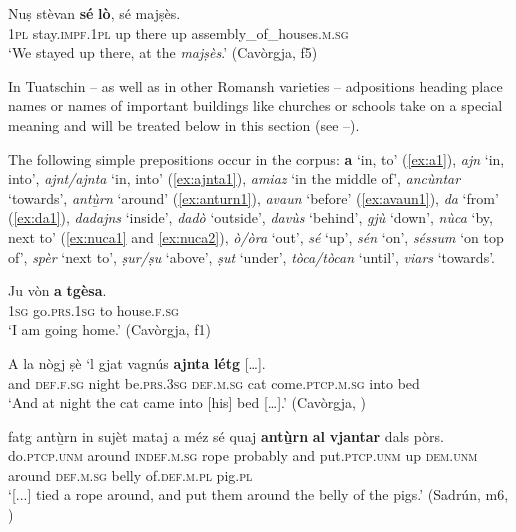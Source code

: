 \ea
\label{selo1}
\gll Nuṣ stèvan \textbf{sé} \textbf{lò}, sé majṣès.\\
\textsc{1pl} stay.\textsc{impf.1pl} up there up assembly\_of\_houses.\textsc{m.sg}\\
\glt `We stayed up there, at the \textit{majṣès}.' (Cavòrgja, f5)
\z

In Tuatschin -- as well as in other Romansh varieties -- adpositions heading place names or names of important buildings like churches or schools take on a special meaning and will be treated below in this section (see --).

The following simple prepositions occur in the corpus: \textbf{a} `in, to' (\ref{ex:a1}), \textit{ajn} `in, into', \textit{ajnt/ajnta} `in, into' (\ref{ex:ajnta1}), \textit{amiaz} `in the middle of', \textit{ancùntar} `towards', \textit{antù̱rn} `around' (\ref{ex:anturn1}), \textit{avaun} `before' (\ref{ex:avaun1}), \textit{da} `from' (\ref{ex:da1}), \textit{dadajns} `inside', \textit{dadò} `outside', \textit{\textit{davùs}} `behind', \textit{gjù} `down', \textit{nùca} `by, next to' (\ref{ex:nuca1} and \ref{ex:nuca2}), \textit{ò/òra} `out', \textit{sé} `up', \textit{sén} `on', \textit{séssum} `on top of', \textit{spèr} `next to', \textit{ṣur/ṣu} `above', \textit{ṣut} `under', \textit{tòca/tòcan} `until', \textit{viars} `towards'.

\ea
\label{ex:a1}
\gll Ju vòn \textbf{a} \textbf{tgèsa}.\\
\textsc{1sg} go.\textsc{prs.1sg} to house.\textsc{f.sg}\\
\glt `I am going home.' (Cavòrgja, f1)
\z

\ea
\label{ex:ajnta1}
\gll A la nògj ṣè `l gjat vagnús \textbf{ajnta} \textbf{létg} […].\\
and \textsc{def.f.sg} night be.\textsc{prs.3sg} \textsc{def.m.sg} cat come.\textsc{ptcp.m.sg} into bed\\
\glt `And at night the cat came into [his] bed […].' (Cavòrgja, \citealt[121]{Büchli1966})
\z

\ea
\label{ex:anturn1}
\gll    [...] fatg antù̱rn in sujèt mataj a méz sé quaj \textbf{antù̱rn} \textbf{al} \textbf{vjantar} dals pòrs.\\
{} do.\textsc{ptcp.unm} around \textsc{indef.m.sg} rope probably and put.\textsc{ptcp.unm} up  \textsc{dem.unm} around \textsc{def.m.sg} belly of.\textsc{def.m.pl} pig.\textsc{pl} \\
\glt `[...] tied a rope around, and put them around the belly of the pigs.' (Sadrún, m6, )
\z

